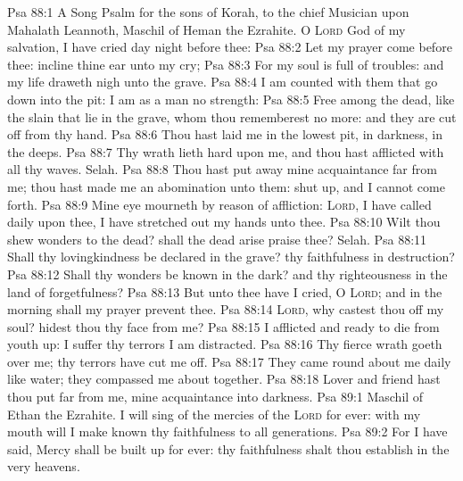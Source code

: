 \vs Psa 88:1 A Song  Psalm for the sons of Korah, to the chief Musician upon Mahalath Leannoth, Maschil of Heman the Ezrahite. O \textsc{Lord} God of my salvation, I have cried day  night before thee:
\vs Psa 88:2 Let my prayer come before thee: incline thine ear unto my cry;
\vs Psa 88:3 For my soul is full of troubles: and my life draweth nigh unto the grave.
\vs Psa 88:4 I am counted with them that go down into the pit: I am as a man  no strength:
\vs Psa 88:5 Free among the dead, like the slain that lie in the grave, whom thou rememberest no more: and they are cut off from thy hand.
\vs Psa 88:6 Thou hast laid me in the lowest pit, in darkness, in the deeps.
\vs Psa 88:7 Thy wrath lieth hard upon me, and thou hast afflicted  with all thy waves. Selah.
\vs Psa 88:8 Thou hast put away mine acquaintance far from me; thou hast made me an abomination unto them:  shut up, and I cannot come forth.
\vs Psa 88:9 Mine eye mourneth by reason of affliction: \textsc{Lord}, I have called daily upon thee, I have stretched out my hands unto thee.
\vs Psa 88:10 Wilt thou shew wonders to the dead? shall the dead arise  praise thee? Selah.
\vs Psa 88:11 Shall thy lovingkindness be declared in the grave?  thy faithfulness in destruction?
\vs Psa 88:12 Shall thy wonders be known in the dark? and thy righteousness in the land of forgetfulness?
\vs Psa 88:13 But unto thee have I cried, O \textsc{Lord}; and in the morning shall my prayer prevent thee.
\vs Psa 88:14 \textsc{Lord}, why castest thou off my soul?  hidest thou thy face from me?
\vs Psa 88:15 I  afflicted and ready to die from  youth up:  I suffer thy terrors I am distracted.
\vs Psa 88:16 Thy fierce wrath goeth over me; thy terrors have cut me off.
\vs Psa 88:17 They came round about me daily like water; they compassed me about together.
\vs Psa 88:18 Lover and friend hast thou put far from me,  mine acquaintance into darkness.
\vs Psa 89:1 Maschil of Ethan the Ezrahite. I will sing of the mercies of the \textsc{Lord} for ever: with my mouth will I make known thy faithfulness to all generations.
\vs Psa 89:2 For I have said, Mercy shall be built up for ever: thy faithfulness shalt thou establish in the very heavens.
